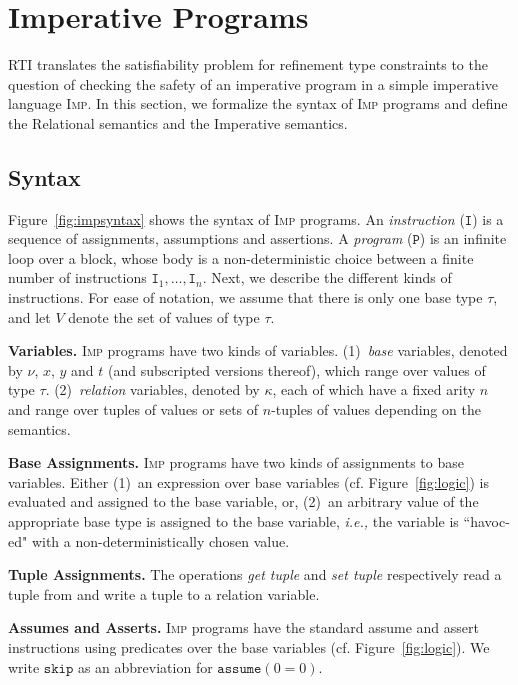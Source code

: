 \documentclass[nocopyrightspace]{sigplanconf}
\def\mypara#1{\smallskip\noindent\textbf{#1}}
\newcommand{\ie}{\textit{i.e.,}\xspace}
\newcommand\HMC{\textsc{RTI}\xspace}
\def\valu{\nu}
\newcommand{\kvar}{\kappa}
\newcommand{\typ}{\tau}
\newcommand{\ilang}{\textsc{Imp}\xspace}
\def\ASSUME{{{\mathtt{assume}}}}
\def\SKIP{{{\mathtt{skip}}}}
\def\vals{V}
\def\instr{\mathtt{I}}
\def\prgm{\mathtt{P}}
\def\rkvar{{\kvar}}
\def\RELSEM{{Relational}\xspace}
\def\IMPSEM{{Imperative}\xspace}
\def\REFREL{relation\xspace}
\begin{document}
\section{Imperative Programs}\label{sec:imp}

\HMC translates the satisfiability problem for refinement type constraints
to the question of checking the safety of an imperative program in a simple
imperative language \ilang.
In this section, we formalize the syntax of \ilang programs 
and define the \RELSEM semantics 
and the \IMPSEM semantics. 




\subsection{Syntax}
\label{sec:impsyntax}

Figure~\ref{fig:impsyntax} shows the syntax of \ilang programs. 
An \emph{instruction} ($\instr$) is a sequence of assignments, assumptions 
and assertions. 
A \emph{program} ($\prgm$) is an infinite loop over a block, whose body
is a non-deterministic choice between a finite number of instructions
$\instr_1,\ldots,\instr_n$.
Next, we describe the different kinds of instructions.
For ease of notation, we assume that there is only one base type $\typ$,
and let $\vals$ denote the set of values of type $\typ$.

\mypara{Variables.} \ilang programs have two kinds of variables. 
(1)~\emph{base} variables, denoted by 
$\valu$, $x$, $y$ and $t$ (and subscripted versions thereof), 
which range over values of type $\typ$.
(2)~\emph{\REFREL} variables, denoted by $\rkvar$,
each of which have a fixed arity $n$ and range over tuples of values
or sets of $n$-tuples of values depending on the semantics.

\mypara{Base Assignments.}
\ilang programs have two kinds of assignments to base variables. 
Either
(1)~an expression over base variables (cf. Figure~\ref{fig:logic}) 
is evaluated and assigned to the base variable, or,
(2)~an arbitrary value of the appropriate base type is assigned to the base
variable, \ie the variable is ``havoc-ed" with a non-deterministically
chosen value.


\mypara{Tuple Assignments.}
The operations \emph{get tuple} and \emph{set tuple} 
respectively read a tuple from and write a tuple to a \REFREL 
variable.

\mypara{Assumes and Asserts.}
\ilang programs have the standard assume and assert instructions using 
predicates over the base variables (cf. Figure~\ref{fig:logic}).
We write $\SKIP$ as an abbreviation for $\ASSUME(0=0)$.
\end{document}
